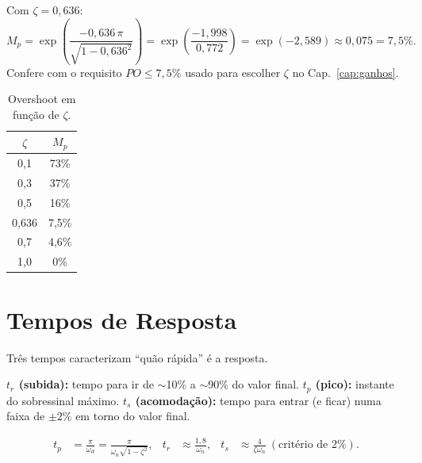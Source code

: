 \begin{exemplo}
Com $\zeta=0{,}636$:
\[
M_p=\exp\!\left(\frac{-0{,}636\,\pi}{\sqrt{1-0{,}636^2}}\right)
=\exp\!\left(\frac{-1{,}998}{0{,}772}\right)=\exp(-2{,}589)\approx 0{,}075=7{,}5\%.
\]
Confere com o requisito $PO\le7{,}5\%$ usado para escolher $\zeta$ no Cap.~\ref{cap:ganhos}.
\end{exemplo}

\begin{table}[h]\centering
\caption{Overshoot em fun\c{c}\~ao de $\zeta$.}
\label{tab:mp}
\begin{tabular}{cc}
\toprule $\zeta$ & $M_p$ \\ \midrule
0,1 & 73\% \\ 0,3 & 37\% \\ 0,5 & 16\% \\ 0,636 & 7,5\% \\ 0,7 & 4,6\% \\ 1,0 & 0\% \\
\bottomrule
\end{tabular}
\end{table}

\chapter{Tempos de Resposta}\label{cap:tempos}

Tr\^es tempos caracterizam ``qu\~ao r\'apida'' \'e a resposta.

\begin{conceito}
\textbf{$t_r$ (subida):} tempo para ir de $\sim$10\% a $\sim$90\% do valor final.
\textbf{$t_p$ (pico):} instante do sobressinal m\'aximo.
\textbf{$t_s$ (acomoda\c{c}\~ao):} tempo para entrar (e ficar) numa faixa de
$\pm2\%$ em torno do valor final.
\end{conceito}

\begin{align}
t_p &= \frac{\pi}{\omega_d}=\frac{\pi}{\omega_n\sqrt{1-\zeta^2}}, &
t_r &\approx \frac{1{,}8}{\omega_n}, &
t_s &\approx \frac{4}{\zeta\omega_n}\ (\text{crit\'erio de }2\%).
\end{align}

